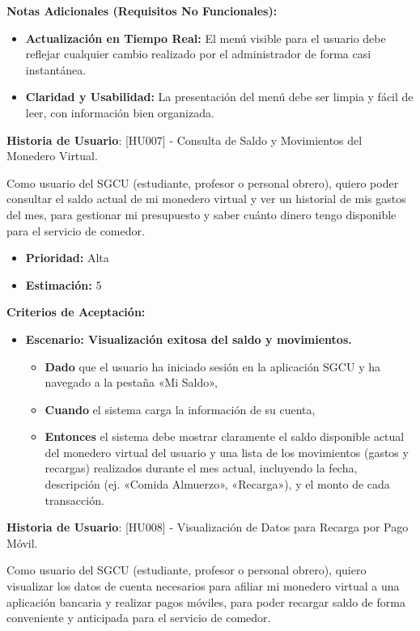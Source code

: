 \documentclass[12pt]{article}
\begin{document}
\textbf{Notas Adicionales (Requisitos No Funcionales):}
\begin{itemize}
    \item \textbf{Actualización en Tiempo Real:} El menú visible para el usuario debe reflejar cualquier cambio realizado por el administrador de forma casi instantánea.
    \item \textbf{Claridad y Usabilidad:} La presentación del menú debe ser limpia y fácil de leer, con información bien organizada.
\end{itemize}

\pagebreak

\textbf{Historia de Usuario}: [HU007] - Consulta de Saldo y Movimientos del Monedero Virtual.

Como usuario del SGCU (estudiante, profesor o personal obrero), quiero poder consultar el saldo actual de mi monedero virtual y ver un historial de mis gastos del mes, para gestionar mi presupuesto y saber cuánto dinero tengo disponible para el servicio de comedor.

\begin{itemize}
    \item \textbf{Prioridad:} Alta
    \item \textbf{\textbf{Estimación:}} 5
\end{itemize}

\textbf{Criterios de Aceptación:}
\begin{itemize}
    \item \textbf{Escenario: Visualización exitosa del saldo y movimientos.}
    \begin{itemize}
        \item \textbf{Dado} que el usuario ha iniciado sesión en la aplicación SGCU y ha navegado a la pestaña «Mi Saldo»,
        \item \textbf{Cuando} el sistema carga la información de su cuenta,
        \item \textbf{Entonces} el sistema debe mostrar claramente el saldo disponible actual del monedero virtual del usuario y una lista de los movimientos (gastos y recargas) realizados durante el mes actual, incluyendo la fecha, descripción (ej. «Comida Almuerzo», «Recarga»), y el monto de cada transacción.
    \end{itemize}
\end{itemize}

\textbf{Historia de Usuario}: [HU008] - Visualización de Datos para Recarga por Pago Móvil.

Como usuario del SGCU (estudiante, profesor o personal obrero), quiero visualizar los datos de cuenta necesarios para afiliar mi monedero virtual a una aplicación bancaria y realizar pagos móviles, para poder recargar saldo de forma conveniente y anticipada para el servicio de comedor.
\end{document}
